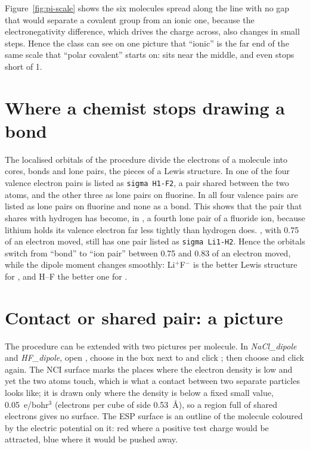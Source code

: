 Figure~\ref{fig:pi-scale} shows the six molecules spread along the line with no gap that would separate a covalent group from an ionic one, because the electronegativity difference, which drives the charge across, also changes in small steps. Hence the class can see on one picture that ``ionic'' is the far end of the same scale that ``polar covalent'' starts on:  sits near the middle, and even  stops short of 1.

\section{Where a chemist stops drawing a bond}
The localised orbitals of the procedure divide the electrons of a molecule into cores, bonds and lone pairs, the pieces of a Lewis structure. In  one of the four valence electron pairs is listed as \texttt{sigma H1-F2}, a pair shared between the two atoms, and the other three as lone pairs on fluorine. In  all four valence pairs are listed as lone pairs on fluorine and none as a bond. This shows that the pair that  shares with hydrogen has become, in , a fourth lone pair of a fluoride ion, because lithium holds its valence electron far less tightly than hydrogen does. , with 0.75 of an electron moved, still has one pair listed as \texttt{sigma Li1-H2}. Hence the orbitals switch from ``bond'' to ``ion pair'' between 0.75 and 0.83 of an electron moved, while the dipole moment changes smoothly: Li$^+$F$^-$ is the better Lewis structure for , and H--F the better one for .

\section{Contact or shared pair: a picture}
The procedure can be extended with two pictures per molecule. In \emph{NaCl\_dipole} and \emph{HF\_dipole}, open , choose  in the box next to  and click ; then choose  and click  again. The NCI surface marks the places where the electron density is low and yet the two atoms touch, which is what a contact between two separate particles looks like; it is drawn only where the density is below a fixed small value, 0.05~e/bohr$^3$ (electrons per cube of side \SI{0.53}{\angstrom}), so a region full of shared electrons gives no surface. The ESP surface is an outline of the molecule coloured by the electric potential on it: red where a positive test charge would be attracted, blue where it would be pushed away.

